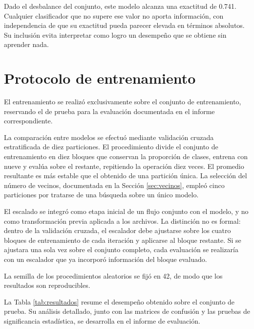 \documentclass[11pt]{article}
\begin{document}
Dado el desbalance del conjunto, este modelo alcanza una exactitud de 0.741. Cualquier
clasificador que no supere ese valor no aporta información, con independencia de que su exactitud
pueda parecer elevada en términos absolutos. Su inclusión evita interpretar como logro un
desempeño que se obtiene sin aprender nada.

\section{Protocolo de entrenamiento}

El entrenamiento se realizó exclusivamente sobre el conjunto de entrenamiento, reservando el de
prueba para la evaluación documentada en el informe correspondiente.

La comparación entre modelos se efectuó mediante validación cruzada estratificada de diez
particiones. El procedimiento divide el conjunto de entrenamiento en diez bloques que conservan la
proporción de clases, entrena con nueve y evalúa sobre el restante, repitiendo la operación diez
veces. El promedio resultante es más estable que el obtenido de una partición única. La selección
del número de vecinos, documentada en la Sección \ref{sec:vecinos}, empleó cinco particiones por
tratarse de una búsqueda sobre un único modelo.

El escalado se integró como etapa inicial de un flujo conjunto con el modelo, y no como
transformación previa aplicada a los archivos. La distinción no es formal: dentro de la validación
cruzada, el escalador debe ajustarse sobre los cuatro bloques de entrenamiento de cada iteración y
aplicarse al bloque restante. Si se ajustara una sola vez sobre el conjunto completo, cada
evaluación se realizaría con un escalador que ya incorporó información del bloque evaluado.

La semilla de los procedimientos aleatorios se fijó en 42, de modo que los resultados son
reproducibles.

La Tabla \ref{tab:resultados} resume el desempeño obtenido sobre el conjunto de prueba. Su
análisis detallado, junto con las matrices de confusión y las pruebas de significancia
estadística, se desarrolla en el informe de evaluación.



\end{document}
